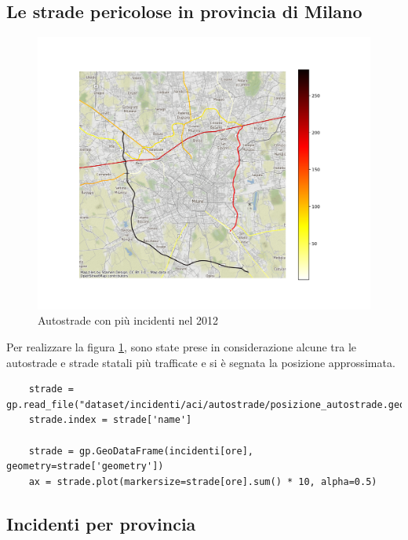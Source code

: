 \documentclass[a4paper]{report}
\begin{document}

\subsection{Le strade pericolose in provincia di Milano}

\begin{figure}
    \includegraphics[width=\linewidth]{../src/incidenti/incidenti_aci/autostrade/incidenti_line_chart.png}
    \caption{Autostrade con più incidenti nel 2012}
    \label{fig:line-incidenti-milano}
\end{figure}

Per realizzare la figura \ref{fig:line-incidenti-milano}, sono state prese in considerazione alcune 
tra le autostrade e strade statali più trafficate e si è segnata la posizione approssimata.

\begin{lstlisting}
    strade = gp.read_file("dataset/incidenti/aci/autostrade/posizione_autostrade.geojson").to_crs(epsg=3857)
    strade.index = strade['name']

    strade = gp.GeoDataFrame(incidenti[ore], geometry=strade['geometry'])
    ax = strade.plot(markersize=strade[ore].sum() * 10, alpha=0.5)
\end{lstlisting}


\subsection{Incidenti per provincia}
\end{document}
